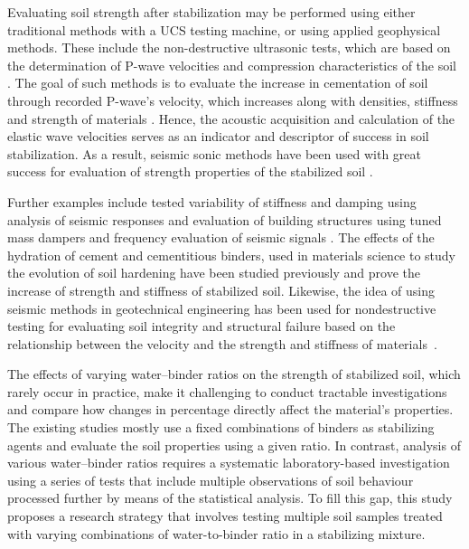 \documentclass[sustainability,article,accept,pdftex,moreauthors]{Definitions/mdpi}
\begin{document}
Evaluating soil strength after stabilization may be performed using either traditional methods with a UCS testing machine, or using applied geophysical methods. These include the non-destructive ultrasonic tests, which are based on the determination of P-wave velocities and compression characteristics of the{ soil} \cite{Yesiller}. The goal of such methods is to evaluate the increase in cementation of soil through recorded P-wave's velocity, which increases along with densities, stiffness and strength of materials \cite{ZHANG2021143,Lindh2023JMBM,Abdi}. Hence, the acoustic acquisition and calculation of {the }elastic wave velocities serves as an indicator {and descriptor }of success in soil stabilization. As a result, seismic sonic methods have been {used }with great success for evaluation of strength properties of {the }stabilized soil \cite{Lopes,Lindh202210,CRISTELO20151}. 

{Further examples include tested variability of stiffness and damping using analysis of seismic responses} \cite{WANG2022114963} {and evaluation of building structures using tuned mass dampers and frequency evaluation of seismic signals} \cite{WANG2022107298}. The effects of the hydration of cement and cementitious binders, used in materials science to study the evolution of soil hardening have been studied previously \cite{Ardah,Sree,su142113736} and prove the increase of strength and stiffness of stabilized soil. Likewise, the idea of using seismic methods in geotechnical engineering has been used for nondestructive testing for evaluating soil integrity and structural failure based on the relationship between the velocity and the strength and stiffness of \mbox{materials \cite{Yu}.}  

{The effects of varying water--binder ratios on the strength of stabilized soil, which rarely occur in practice, make it challenging to conduct tractable investigations and compare how changes in percentage directly affect the material's properties. %
The existing studies mostly use a fixed combinations of binders as stabilizing agents and evaluate the soil properties using a given ratio. In contrast, analysis of various water--binder ratios requires a systematic laboratory-based investigation using a series of tests that include multiple observations of soil behaviour processed further by means of the statistical analysis. To fill this gap, this study proposes a research strategy that involves testing multiple soil samples treated with varying combinations of water-to-binder ratio in a stabilizing mixture.}
\end{document}
